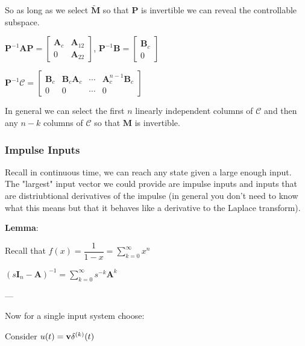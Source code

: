 \documentclass[11pt]{article}
\begin{document}
  \vspace{12pt}

  So as long as we select \(\tilde{\bm{M}}\) so that \(\bm{P}\) is invertible we can reveal
  the controllable subspace.

  \(\bm{P}^{-1}\bm{A}\bm{P} =
  \begin{bmatrix}
    \bm{A}_{c} & \bm{A}_{12} \\
    0 & \bm{A}_{22}
  \end{bmatrix}\),
  \(\bm{P}^{-1}\bm{B} = \begin{bmatrix} \bm{B}_c \\ 0 \end{bmatrix}\)

  \(\bm{P}^{-1}\mathcal{C} =
  \begin{bmatrix}
    \bm{B}_c  & \bm{B}_c\bm{A}_{c} & \cdots & \bm{A}_{c}^{n - 1}\bm{B}_c \\
    0 & 0 & \cdots & 0
  \end{bmatrix}\)

  In general we can select the first \(n\) linearly independent columns of \(\mathcal{C}\) and
  then any \(n - k\) columns of \(\mathcal{C}\) so that \(\bm{M}\) is invertible.

  \pagebreak

  \subsubsection{Impulse Inputs}
  Recall in continuous time, we can reach any state given a large enough input.
  The "largest" input vector we could provide are impulse inputs and inputs that are
  distriubtional derivatives of the impulse (in general you don't need to know what this
  means but that it behaves like a derivative to the Laplace transform).

  \textbf{Lemma}:

  Recall that \(f(x) = \dfrac{1}{1 - x} = \displaystyle \sum_{k = 0}^\infty x^n\)

  \((s\bm{I}_n - \bm{A})^{-1} = \displaystyle \sum_{k = 0}^\infty s^{-k}\bm{A}^k\)

  ---

  \vspace{12pt}

  Now for a single input system choose:

  Consider \(u(t) = \mathbf{v}\delta^{(k)}(t)\)
\end{document}
